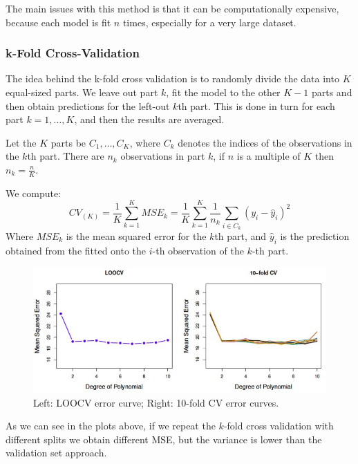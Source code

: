 The main issues with this method is that it can be computationally expensive, because each model is fit $n$ times, especially for a very large dataset.

\subsubsection*{k-Fold Cross-Validation}
The idea behind the k-fold cross validation is to randomly divide the data into $K$ equal-sized parts. We leave out part $k$, fit the model to the other $K-1$ parts and then obtain predictions for the left-out $k$th part. This is done in turn for each part $k = 1, \dots, K$, and then the results are averaged.

Let the $K$ parts be $C_1, \dots, C_K$, where $C_k$ denotes the indices of the observations in the $k$th part. There are $n_k$ observations in part $k$, if $n$ is a multiple of $K$ then $n_k = \frac{n}{K}$.

We compute:
\[
    CV_{(K)} = \frac{1}{K} \sum_{k=1}^{K} MSE_k = \frac{1}{K} \sum_{k=1}^{K} \frac{1}{n_k} \sum_{i \in C_k} (y_i - \hat{y}_i)^2
\]
Where $MSE_k$ is the mean squared error for the $k$th part, and $\hat{y}_i$ is the prediction obtained from the fitted onto the $i$-th observation of the $k$-th part.
\begin{figure}[ht]
    \centering
    \includegraphics[width=0.8\linewidth]{./figures/chapter_4/lec_15_k_fold_cv.png}
    \caption{Left: LOOCV error curve; Right: 10-fold CV error curves.}
    \label{fig:lec_15_k_fold_cv}
\end{figure}
As we can see in the plots above, if we repeat the $k$-fold cross validation with different splits we obtain different MSE, but the variance is lower than the validation set approach. 

